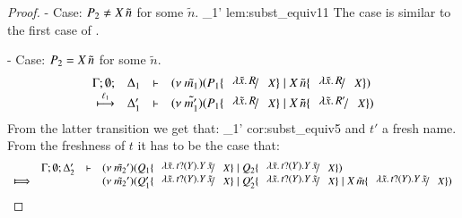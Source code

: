 \begin{proof}
	\noi - Case: $P_2 \not= X\,\tilde{n}$ for some $\tilde{n}$.
%
		{}
		{\Delta_1'}{}
		{lem:subst_equiv11}
%
	\noi The case is similar to the first case of .

	\noi - Case: $P_2 = X\,\tilde{n}$ for some $\tilde{n}$.
%
\[
	\mhorel	{\Gamma}{\Delta_1}{\newsp{\tilde{m_1}}{P_1 \subst{\abs{\tilde{x}}{R}}{X} \Par \appl{X}{\tilde{n}} \subst{\abs{\tilde{x}}{R}}{X}}}
		{\hby{\ell_1}}{\Delta_1'}{}{\newsp{\tilde{m_1'}}{P_1 \subst{\abs{\tilde{x}}{R}}{X} \Par \appl{X}{\tilde{n}} \subst{\abs{\tilde{x}}{R'}}{X}}}
\]
%
	\noi From the latter transition we get that:
%
	{}
	{}
	{\Delta_1'}{}
	{cor:subst_equiv5}
%
%
	\noi and $t'$ a fresh name. From the freshness of $t$
	it has to be the case that:
%
	\[
		\begin{array}{crll}
			& \Gamma; \es; \Delta_2'& \proves &
			\newsp{\tilde{m_2}'}{Q_1 \subst{\abs{\tilde{x}}{\binp{t}{Y} \appl{Y}{\tilde{x}}}}{X} \Par Q_2 \subst{\abs{\tilde{x}}{\binp{t}{Y} \appl{Y}{\tilde{x}}}}{X}}\\
			\Hby{} && &
			\newsp{\tilde{m_2}'}{Q_1' \subst{\abs{\tilde{x}}{\binp{t}{Y} \appl{Y}{\tilde{x}}}}{X} \Par Q_2' \subst{\abs{\tilde{x}}{\binp{t}{Y} \appl{Y}{\tilde{x}}}}{X} \Par \appl{X}{\tilde{m}} \subst{\abs{\tilde{x}}{\binp{t}{Y} \appl{Y}{\tilde{x}}}}{X}} \\

\end{array}\]
\end{proof}
